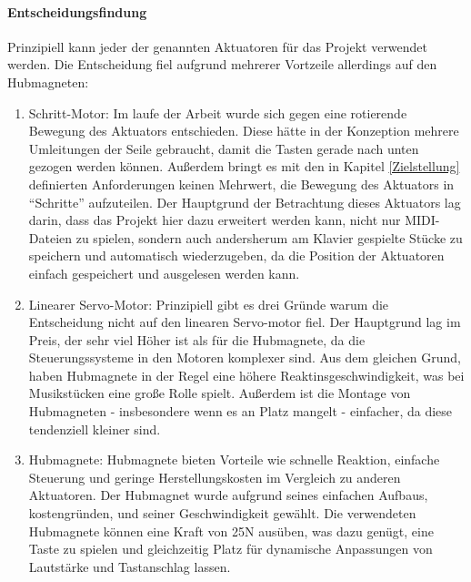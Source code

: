 \paragraph{Entscheidungsfindung}
Prinzipiell kann jeder der genannten Aktuatoren für das Projekt verwendet werden. Die Entscheidung fiel aufgrund
mehrerer Vortzeile allerdings auf den Hubmagneten:
\begin{enumerate}
	\item Schritt-Motor: Im laufe der Arbeit wurde sich gegen eine rotierende Bewegung des Aktuators entschieden. Diese
	hätte in der Konzeption mehrere Umleitungen der Seile gebraucht, damit die Tasten gerade nach unten gezogen werden können.
	Außerdem bringt es mit den in Kapitel \ref{Zielstellung} definierten Anforderungen keinen Mehrwert,
	die Bewegung des Aktuators in \enquote{Schritte} aufzuteilen. Der Hauptgrund der Betrachtung dieses Aktuators lag darin,
	dass das Projekt hier dazu erweitert werden kann, nicht nur MIDI-Dateien zu spielen, sondern auch andersherum am Klavier
	gespielte Stücke zu speichern und automatisch wiederzugeben, da die Position der Aktuatoren einfach gespeichert und
	ausgelesen werden kann. %
	\item Linearer Servo-Motor: Prinzipiell gibt es drei Gründe warum die Entscheidung nicht auf den linearen Servo-motor fiel.
	Der Hauptgrund lag im Preis, der sehr viel Höher ist als für die Hubmagnete, da die Steuerungssysteme in den Motoren komplexer sind.
	Aus dem gleichen Grund, haben Hubmagnete in der Regel eine höhere Reaktinsgeschwindigkeit, was bei Musikstücken eine
	große Rolle spielt.
	Außerdem ist die Montage von Hubmagneten - insbesondere wenn es an Platz mangelt - einfacher, da diese tendenziell
	kleiner sind. %
	\item Hubmagnete: Hubmagnete bieten Vorteile wie schnelle Reaktion, einfache Steuerung und geringe
	Herstellungskosten im Vergleich zu anderen Aktuatoren. Der Hubmagnet wurde aufgrund seines einfachen Aufbaus,
	kostengründen, und seiner Geschwindigkeit gewählt. Die verwendeten Hubmagnete können eine Kraft von 25N ausüben,
	was dazu genügt, eine Taste  zu spielen und gleichzeitig Platz für dynamische Anpassungen von Lautstärke und
	Tastanschlag lassen.
\end{enumerate}

